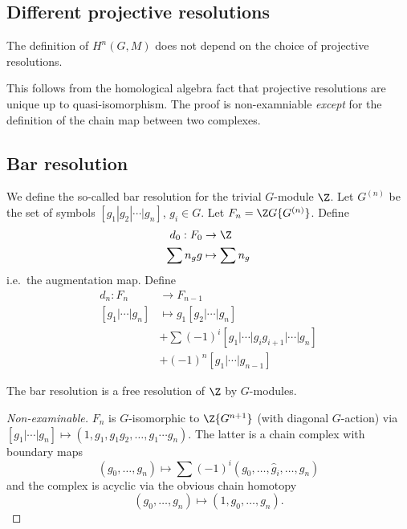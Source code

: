 \documentclass[a4paper]{article}
\begin{document}
\subsection{Different projective resolutions}

\begin{theorem}
  The definition of \(H^n(G, M)\) does not depend on the choice of projective resolutions.
\end{theorem}

This follows from the homological algebra fact that projective resolutions are unique up to quasi-isomorphism. The proof is non-examniable \emph{except} for the definition of the chain map between two complexes.

\subsection{Bar resolution}

We define the so-called bar resolution for the trivial \(G\)-module \(\Z\). Let \(G^{(n)}\) be the set of symbols \([g_1|g_2| \cdots |g_n]\), \(g_i \in G\). Let \(F_n = \Z G \{G^{(n)}\}\). Define
\begin{align*}
  d_0: F_0 &\to \Z \\
  \sum n_g g &\mapsto \sum n_g
\end{align*}
i.e.\ the augmentation map. Define
\begin{align*}
  d_n: F_n &\to F_{n - 1} \\
  [g_1| \cdots |g_n] &\mapsto g_1[g_2| \cdots | g_n] \\
           &+ \sum (-1)^i [g_1| \cdots| g_ig_{i + 1}| \cdots | g_n] \\
           &+ (-1)^n [g_1| \cdots |g_{n - 1}]
\end{align*}

\begin{proposition}
  The bar resolution is a free resolution of \(\Z\) by \(G\)-modules.
\end{proposition}

\begin{proof}[Non-examinable]
  \(F_n\) is \(G\)-isomorphic to \(\Z\{G^{n + 1}\}\) (with diagonal \(G\)-action) via \([g_1| \cdots |g_n] \mapsto (1, g_1, g_1g_2, \dots, g_1 \cdots g_n)\). The latter is a chain complex with boundary maps
  \[
    (g_0, \dots, g_n) \mapsto \sum (-1)^i (g_0, \dots, \hat g_i, \dots, g_n)
  \]
  and the complex is acyclic via the obvious chain homotopy
  \[
    (g_0, \dots, g_n) \mapsto (1, g_0, \dots, g_n).
  \]
\end{proof}
\end{document}

